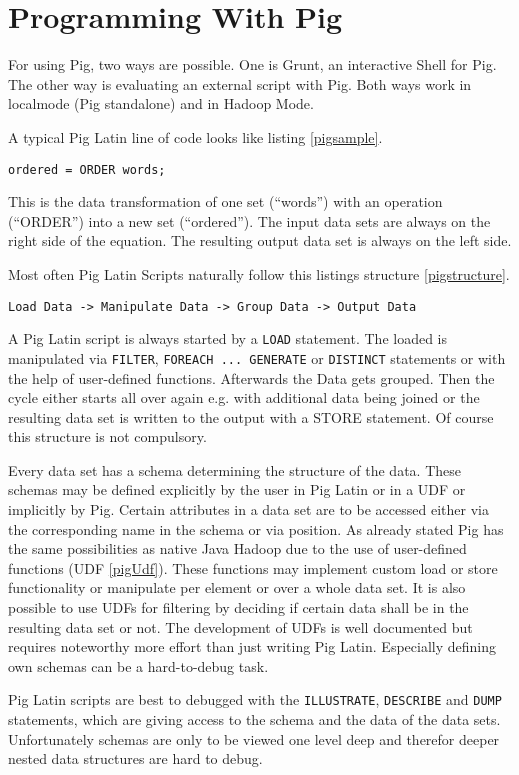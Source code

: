 \section{Programming With Pig}

For using Pig, two ways are possible. One is Grunt, an interactive Shell for Pig. The other way is evaluating an external script with Pig. Both ways work in localmode (Pig standalone) and in Hadoop Mode.
                              
A typical Pig Latin line of code looks like listing \ref{pigsample}.

\begin{lstlisting}[language=pig,caption=A typical Pig line of code,label=pigsample]
ordered = ORDER words;
\end{lstlisting}

This is the data transformation of one set (``words'') with an operation (``ORDER'') into a new set (``ordered''). The input data sets are always on the right side of the equation. The resulting output data set is always on the left side.

Most often Pig Latin Scripts naturally follow this listings structure \ref{pigstructure}.

\begin{lstlisting}[language=pig,caption=Pig Latin Script Structure ,label=pigstructure]
Load Data -> Manipulate Data -> Group Data -> Output Data
\end{lstlisting}
                                                       
A Pig Latin script is always started by a {\tt LOAD} statement. The loaded is manipulated via {\tt FILTER}, {\tt FOREACH ... GENERATE} or {\tt DISTINCT} statements or with the help of user-defined functions. Afterwards the Data gets grouped. Then the cycle either starts all over again e.g. with additional data being joined or the resulting data set is written to the output with a STORE statement. Of course this structure is not compulsory.
                   
Every data set has a schema determining the structure of the data. These schemas may be defined explicitly by the user in Pig Latin or in a UDF or implicitly by Pig. Certain attributes in a data set are to be accessed either via the corresponding name in the schema or via position.
As already stated Pig has the same possibilities as native Java Hadoop due to the use of user-defined functions (UDF \ref{pigUdf}). These functions may implement custom load or store functionality or manipulate per element or over a whole data set. It is also possible to use UDFs for filtering by deciding if certain data shall be in the resulting data set or not.
The development of UDFs is well documented but requires noteworthy more effort than just writing Pig Latin. Especially defining own schemas can be a hard-to-debug task. 

Pig Latin scripts are best to debugged with the {\tt ILLUSTRATE}, {\tt DESCRIBE} and {\tt DUMP} statements, which are giving access to the schema and the data of the data sets. Unfortunately schemas are only to be viewed one level deep and therefor deeper nested data structures are hard to debug.